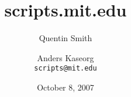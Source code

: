 \documentclass{beamer}
\title{scripts.mit.edu}
\author{Quentin Smith \and Anders Kaseorg \\ \texttt{scripts@mit.edu}}
\institute{Student Information Processing Board}
\date{October 8, 2007}
\begin{document}
\begin{frame}
    \titlepage
\end{frame}










\end{document}
